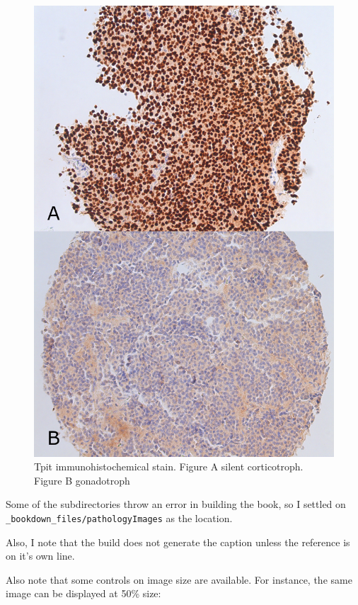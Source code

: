 \documentclass[]{book}
\begin{document}
\begin{figure}
\centering
\includegraphics{_bookdown_files/pathologyImages/TpitIHC.jpg}
\caption{Tpit immunohistochemical stain. Figure A silent corticotroph. Figure B gonadotroph}
\end{figure}

Some of the subdirectories throw an error in building the book, so I settled on \texttt{\_bookdown\_files/pathologyImages} as the location.

Also, I note that the build does not generate the caption unless the reference is on it's own line.

Also note that some controls on image size are available. For instance, the same image can be displayed at 50\% size:
\end{document}
